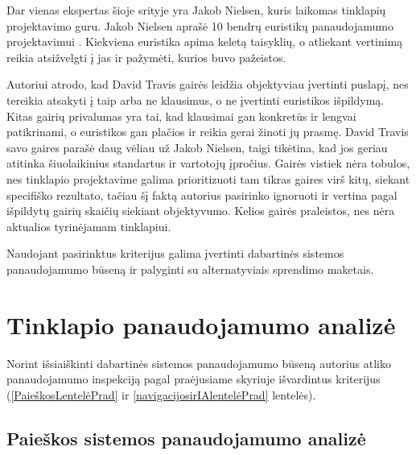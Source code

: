 \documentclass{VUMIFPSkursinis}
\begin{document}
Dar vienas ekspertas šioje srityje yra Jakob Nielsen, kuris laikomas tinklapių projektavimo guru. Jakob Nielsen aprašė 10 bendrų euristikų panaudojamumo projektavimui \cite{NielsenHeuristicsEn}. Kiekviena euristika apima keletą taisyklių, o atliekant vertinimą reikia atsižvelgti į jas ir pažymėti, kurios buvo pažeistos.

Autoriui atrodo, kad David Travis gairės leidžia objektyviau įvertinti puslapį, nes tereikia atsakyti į taip arba ne klausimus, o ne įvertinti euristikos išpildymą. Kitas gairių privalumas yra tai, kad klausimai gan konkretūs ir lengvai patikrinami, o euristikos gan plačios ir reikia gerai žinoti jų prasmę. David Travis savo gaires parašė daug vėliau už Jakob Nielsen, taigi tikėtina, kad jos geriau atitinka šiuolaikinius standartus ir vartotojų įpročius. Gairės vistiek nėra tobulos, nes tinklapio projektavime galima prioritizuoti tam tikras gaires virš kitų, siekant specifiško rezultato, tačiau šį faktą autorius pasirinko ignoruoti ir vertina pagal išpildytų gairių skaičių siekiant objektyvumo. Kelios gairės praleistos, nes nėra aktualios tyrinėjamam tinklapiui.

Naudojant pasirinktus kriterijus galima įvertinti dabartinės sistemos panaudojamumo būseną ir palyginti su alternatyviais sprendimo maketais.



\section{Tinklapio panaudojamumo analizė}
Norint išsiaiškinti dabartinės sistemos panaudojamumo būseną autorius atliko panaudojamumo inspekciją pagal praėjusiame skyriuje išvardintus kriterijus (\ref{PaieškosLentelėPrad} ir \ref{navigacijosirIAlentelėPrad} lentelės).
\subsection{Paieškos sistemos panaudojamumo analizė}
\end{document}
